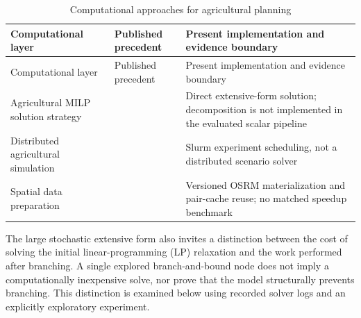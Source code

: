 \documentclass[
  english,
  11pt,
  a4paper,
  authoryear,
  preprint]{elsarticle}
\begin{document}
\begin{longtable}[]{@{}
  >{\raggedright\arraybackslash}p{}
  >{\raggedright\arraybackslash}p{}
  >{\raggedright\arraybackslash}p{}@{}}
\caption{Computational approaches for agricultural planning}\label{tbl-computational-literature}\tabularnewline
\toprule\noalign{}
\begin{minipage}[b]{\linewidth}\raggedright
Computational layer
\end{minipage} & \begin{minipage}[b]{\linewidth}\raggedright
Published precedent
\end{minipage} & \begin{minipage}[b]{\linewidth}\raggedright
Present implementation and evidence boundary
\end{minipage} \\
\midrule\noalign{}
\endfirsthead
\toprule\noalign{}
\begin{minipage}[b]{\linewidth}\raggedright
Computational layer
\end{minipage} & \begin{minipage}[b]{\linewidth}\raggedright
Published precedent
\end{minipage} & \begin{minipage}[b]{\linewidth}\raggedright
Present implementation and evidence boundary
\end{minipage} \\
\midrule\noalign{}
\endhead
\bottomrule\noalign{}
\endlastfoot
Agricultural MILP solution strategy & \citet{shastri2011} & Direct
extensive-form solution; decomposition is not implemented in the
evaluated scalar pipeline \\
Distributed agricultural simulation & \citet{knapen2025} & Slurm
experiment scheduling, not a distributed scenario solver \\
Spatial data preparation & \citet{zhao2012} & Versioned OSRM
materialization and pair-cache reuse; no matched speedup benchmark \\

\end{longtable}

\noindent The large stochastic extensive form also invites a distinction between the cost of solving the initial linear-programming (LP) relaxation and the work performed after branching. A single explored branch-and-bound node does not imply a computationally inexpensive solve, nor prove that the model structurally prevents branching. This distinction is examined below using recorded solver logs and an explicitly exploratory experiment.
\end{document}
